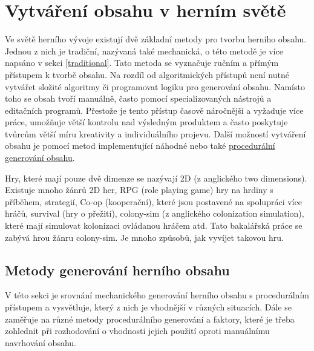 \chapter{Vytváření obsahu v herním světě} 
\label{theory}
Ve světě herního vývoje existují dvě základní metody pro tvorbu herního obsahu. Jednou z nich je tradiční, nazývaná také mechanická, o této metodě je více napsáno v sekci \ref{traditional}. Tato metoda se vyznačuje ručním a přímým přístupem k tvorbě obsahu. Na rozdíl od algoritmických přístupů není nutné vytvářet složité algoritmy či programovat logiku pro generování obsahu. Namísto toho se obsah tvoří manuálně, často pomocí specializovaných nástrojů a editačních programů. Přestože je tento přístup časově náročnější a vyžaduje více práce, umožňuje větší kontrolu nad výsledným produktem a často poskytuje tvůrcům větší míru kreativity a individuálního projevu. Další možností vytváření obsahu je pomocí metod implementující náhodné nebo také \hyperref[procedural]{procedurální generování obsahu}. 

Hry, které mají pouze dvě dimenze se nazývají 2D (z anglického two dimensions). Existuje mnoho žánrů 2D her, RPG (role playing game) hry na hrdiny s příběhem, strategií, Co-op (kooperační), které jsou postavené na spolupráci více hráčů, survival (hry o přežití), colony-sim (z anglického colonization simulation), které mají simulovat kolonizaci ovládanou hráčem atd. Tato bakalářská práce se zabývá hrou žánru colony-sim. Je mnoho způsobů, jak vyvíjet takovou hru.


\section{Metody generování herního obsahu}

V této sekci je srovnání mechanického generování herního obsahu s procedurálním přístupem a vysvětluje, který z nich je vhodnější v různých situacích. Dále se zaměřuje na různé metody procedurálního generování a faktory, které je třeba zohlednit při rozhodování o vhodnosti jejich použití oproti manuálnímu navrhování obsahu.

